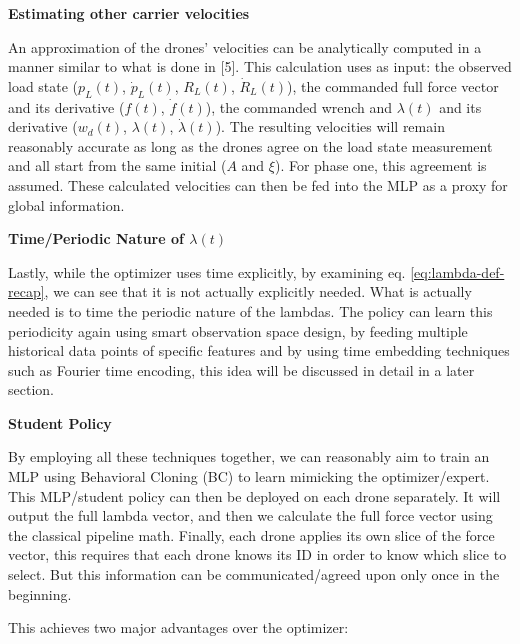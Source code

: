 \noindent\textbf{Estimating other carrier velocities}

An approximation of the drones’ velocities can be analytically
computed in a manner similar to what is done in [5]. This calculation
uses as input: the observed load state ($p_L(t)$, $\dot{p}_L(t)$,
$R_L(t)$, $\dot{R}_L(t)$), the commanded full force vector and its
derivative ($f(t)$, $\dot{f}(t)$), the commanded wrench and $\lambda(t)$
and its derivative ($w_d(t)$, $\lambda(t)$, $\dot{\lambda}(t)$).
The resulting velocities will remain reasonably accurate as long as the
drones agree on the load state measurement and all start from the same
initial (\(A\) and \(\xi\)). For phase one, this
agreement is assumed. These calculated velocities can then be fed into
the MLP as a proxy for global information.

\noindent\textbf{Time/Periodic Nature of $\lambda(t)$}


Lastly, while the optimizer uses time explicitly, by examining eq.
\eqref{eq:lambda-def-recap}, we can see that it is not actually
explicitly needed. What is actually needed is to time the periodic
nature of the lambdas. The policy can learn this periodicity again
using smart
observation space design, by feeding multiple historical data points of
specific features and by using time embedding techniques such as
Fourier time encoding, this idea will be discussed in detail in a later
section.

\noindent\textbf{Student Policy}


By employing all these techniques together, we can reasonably aim to
train an MLP using Behavioral Cloning (BC) to learn mimicking the
optimizer/expert. This MLP/student policy can then be deployed on each drone 
separately. It
will output the full lambda vector, and then we calculate the full force
vector using the classical pipeline math. Finally, each drone applies its
own slice of the force vector, this requires that each drone knows its ID
in order to know which slice to select. But this information can be
communicated/agreed upon only once in the beginning.

This achieves two major advantages over the optimizer:

